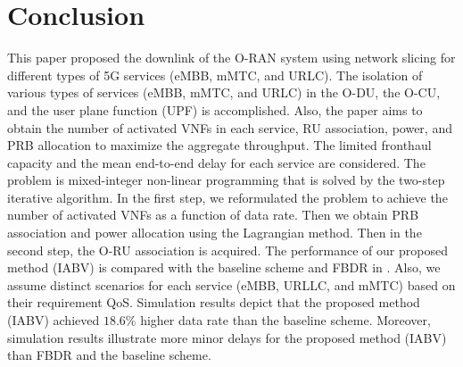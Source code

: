 \documentclass[conference]{IEEEtran}
\begin{document}
\section{Conclusion}\label{conc}
This paper proposed the downlink of the O-RAN system using network slicing for different types of 5G services (eMBB, mMTC, and URLC).
The isolation of various types of services (eMBB, mMTC, and URLC) in the O-DU, the O-CU, and the user plane function (UPF) is accomplished.
Also, the paper aims to obtain the number of activated VNFs in each service, RU association, power, and PRB allocation to maximize the aggregate throughput. The limited fronthaul capacity and the mean end-to-end delay for each service are considered. 
The problem is mixed-integer non-linear programming that is solved by the two-step iterative algorithm.
In the first step, we reformulated the problem to achieve the number of activated VNFs as a function of data rate. Then we obtain PRB association and power allocation using the Lagrangian method.
Then in the second step, the O-RU association is acquired.
The performance of our proposed method (IABV) is compared with the baseline scheme and FBDR in \cite{lee2018dynamic}. 
Also, we assume distinct scenarios for each service (eMBB, URLLC, and mMTC) based on their requirement QoS.
Simulation results depict that the proposed method (IABV) achieved $18.6\%$ higher data rate than the baseline scheme.
Moreover, simulation results illustrate more minor delays for the proposed method (IABV) than FBDR and the baseline scheme.

 

\end{document}
